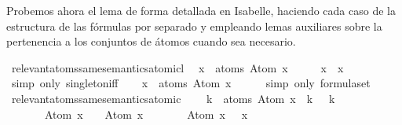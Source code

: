 \begin{isabellebody}
\begin{isamarkuptext}
  Probemos ahora el lema de forma detallada en Isabelle, haciendo cada
  caso de la estructura de las fórmulas por separado y empleando lemas
  auxiliares sobre la pertenencia a los conjuntos de átomos cuando sea 
  necesario.%
\end{isamarkuptext}\isamarkuptrue%
\isamarkupfalse%
\ relevant{\isacharunderscore}atoms{\isacharunderscore}same{\isacharunderscore}semantics{\isacharunderscore}atomic{\isacharunderscore}l{}{\isacharcolon}\isanewline
\ \ {\isachardoublequoteopen}x\ {\isasymin}\ atoms\ {\isacharparenleft}Atom\ x{\isacharparenright}{\isachardoublequoteclose}\isanewline
%
\isadelimproof
%
\endisadelimproof
%
\isatagproof
{}\isamarkupfalse%
\ \isanewline
\ \ \isamarkupfalse%
\ {\isachardoublequoteopen}x\ {\isasymin}\ {\isacharbraceleft}x{\isacharbraceright}{\isachardoublequoteclose}\isanewline
\ \ \ \ \isamarkupfalse%
\ {\isacharparenleft}simp\ only{\isacharcolon}\ singleton{\isacharunderscore}iff{\isacharparenright}\isanewline
{}\isamarkupfalse%
\isanewline
\ \ \isamarkupfalse%
\ {\isachardoublequoteopen}{\isacharbraceleft}x{\isacharbraceright}\ {\isasymsubseteq}\ atoms\ {\isacharparenleft}Atom\ x{\isacharparenright}{\isachardoublequoteclose}\isanewline
\ \ \ \ \isamarkupfalse%
\ {\isacharparenleft}simp\ only{\isacharcolon}\ formula{\isachardot}set{\isacharparenleft}{}{\isacharparenright}{\isacharparenright}\isanewline
{}\isamarkupfalse%
%
\endisatagproof
{\isafoldproof}%
%
\isadelimproof
\isanewline
%
\endisadelimproof
\isanewline
{}\isamarkupfalse%
\ relevant{\isacharunderscore}atoms{\isacharunderscore}same{\isacharunderscore}semantics{\isacharunderscore}atomic{\isacharcolon}\ \isanewline
\ \ \ {\isachardoublequoteopen}{\isasymforall}k\ {\isasymin}\ atoms\ {\isacharparenleft}Atom\ x{\isacharparenright}{\isachardot}\ {\isasymA}\ k\ {\isacharequal}\ {\isasymA}\ k{\isachardoublequoteclose}\isanewline
\ \ \ \ \ {\isachardoublequoteopen}{\isasymA}\ {\isasymTurnstile}\ Atom\ x\ {\isasymlongleftrightarrow}\ {\isasymA}\ {\isasymTurnstile}\ Atom\ x{\isachardoublequoteclose}\isanewline
%
\isadelimproof
%
\endisadelimproof
%
\isatagproof
{}\isamarkupfalse%
\ {\isacharminus}\isanewline
\ \ \isamarkupfalse%
\ {\isachardoublequoteopen}{\isasymA}\ {\isasymTurnstile}\ Atom\ x\ {\isacharequal}\ {\isasymA}\ x{\isachardoublequoteclose}\isanewline

\end{isabellebody}
